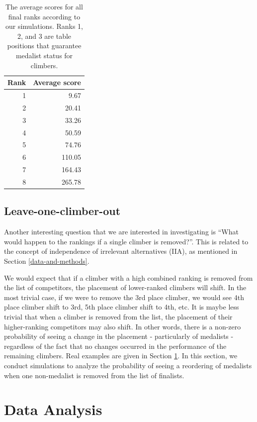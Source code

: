 \documentclass[12pt]{article}
\begin{document}
\begin{table}[ht]
\centering
\caption{The average scores for all final ranks according to our simulations. Ranks 1, 2, and 3 are table positions that guarantee medalist status for climbers.} 
\begin{tabular}{rr}
  \hline
Rank & Average score \\ 
  \hline
  1 & 9.67 \\ 
    2 & 20.41 \\ 
    3 & 33.26 \\ 
    4 & 50.59 \\ 
    5 & 74.76 \\ 
    6 & 110.05 \\ 
    7 & 164.43 \\ 
    8 & 265.78 \\ 
   \hline
\end{tabular}
\end{table}

\hypertarget{leave-one-climber-out}{%
\subsection{Leave-one-climber-out}\label{leave-one-climber-out}}

Another interesting question that we are interested in investigating is
``What would happen to the rankings if a single climber is removed?''.
This is related to the concept of independence of irrelevant
alternatives (IIA), as mentioned in Section \ref{data-and-methods}.

We would expect that if a climber with a high combined ranking is
removed from the list of competitors, the placement of lower-ranked
climbers will shift. In the most trivial case, if we were to remove the
3rd place climber, we would see 4th place climber shift to 3rd, 5th
place climber shift to 4th, etc. It is maybe less trivial that when a
climber is removed from the list, the placement of their higher-ranking
competitors may also shift. In other words, there is a non-zero
probability of seeing a change in the placement - particularly of
medalists - regardless of the fact that no changes occurred in the
performance of the remaining climbers. Real examples are given in
Section \ref{data-analysis}. In this section, we conduct simulations to
analyze the probability of seeing a reordering of medalists when one
non-medalist is removed from the list of finalists.

\hypertarget{data-analysis}{%
\section{Data Analysis}\label{data-analysis}}
\end{document}
